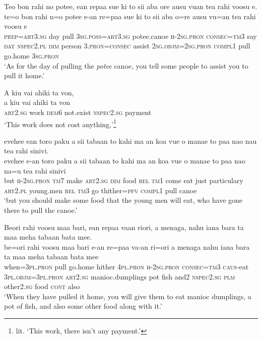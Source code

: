 \ea\label{ex:text18-34}
Teo bon rahi no potee, ean repaa sue ki to sii aba ore ausu vuan tea rahi voosu e.\\
\gll te=o	bon	rahi	n=o	potee	e-an	re=paa	sue	ki	to	sii	aba	o=re	ausu	vu=an	tea	rahi	voosu	e\\
     \textsc{prep}=\textsc{art}3.\textsc{sg}	day	pull	3\textsc{sg}.\textsc{poss}=\textsc{art}3.\textsc{sg}	potee.canoe	\textsc{h}-2\textsc{sg}.\textsc{pron}	\textsc{consec}=\textsc{tm}3	say	\textsc{dat}	\textsc{nspec}2.\textsc{pl}	\textsc{dim}	person	3.\textsc{pron}=\textsc{consec}	assist	2\textsc{sg}.\textsc{objm}=2\textsc{sg}.\textsc{pron}	\textsc{compl}1	pull	go.home	3\textsc{sg}.\textsc{pron}\\
\glt `As for the day of pulling the \textit{potee} canoe, you tell some people to assist you to pull it home.'
\z

\ea\label{ex:text18-35}
A kiu vai ahiki ta von,\\
\gll a	kiu	vai	ahiki	ta	von\\
     \textsc{art}2.\textsc{sg}	work	\textsc{dem}6	not.exist	\textsc{nspec}2.\textsc{sg}	payment\\
\glt `This work does not cost anything,'\footnote{lit. `This work, there isn't any payment.'}
\z

\ea\label{ex:text18-36}
evehee ean toro paku a sii tabaan to kahi ma an koa vue o manae to paa nao nau tea rahi sinivi.\\
\gll evehee	e-an	toro	paku	a	sii	tabaan	to	kahi	ma	an	koa	vue	o	manae	to	paa	nao	na=u	tea	rahi	sinivi\\
     but	\textsc{h}-2\textsc{sg}.\textsc{pron}	\textsc{tm}7	make	\textsc{art}2.\textsc{sg}	\textsc{dim}	food	\textsc{rel}	\textsc{tm}1	come	eat	just	particulary	\textsc{art}2.\textsc{pl}	young.men	\textsc{rel}	\textsc{tm}3	go	thither=\textsc{pfv}	\textsc{compl}1	pull	canoe\\
\glt `but you should make some food that the young men will eat, who have gone there to pull the canoe.'
\z

\ea\label{ex:text18-37}
Beori rahi voosu maa bari, ean repaa vaan riori, a menaga, nahu iana bara ta maa meha tabaan bata mee.\\
\gll be=ori	rahi	voosu	maa	bari	e-an	re=paa	va-an	ri=ori	a	menaga	nahu	iana	bara	ta	maa	meha	tabaan	bata	mee\\
     when=3\textsc{pl}.\textsc{pron}	pull	go.home	hither	4\textsc{pl}.\textsc{pron}	\textsc{h}-2\textsc{sg}.\textsc{pron}	\textsc{consec}=\textsc{tm}3	\textsc{caus}-eat	3\textsc{pl}.\textsc{objm}=3\textsc{pl}.\textsc{pron}	\textsc{art}2.\textsc{sg}	manioc.dumplings	pot	fish	and2	\textsc{nspec}2.\textsc{sg}	\textsc{plm}	other2.\textsc{sg}	food	\textsc{cont}	also\\
\glt `When they have pulled it home, you will give them to eat manioc dumplings, a pot of fish, and also some other food along with it.'
\z

